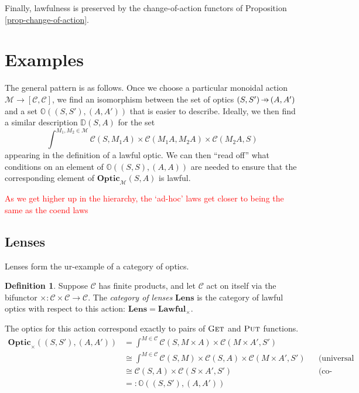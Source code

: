 \documentclass[11pt,a4paper]{article}
\theoremstyle{plain}
\theoremstyle{definition}
\newtheorem{definition}[theorem]{Definition}
\newcommand{\C}{\mathscr{C}}
\newcommand{\M}{\mathscr{M}}
\newcommand{\Optic}{\mathbf{Optic}}
\newcommand{\Lawful}{\mathbf{Lawful}}
\newcommand{\Lens}{\mathbf{Lens}}
\newcommand{\fget}{\textsc{Get}}
\newcommand{\fput}{\textsc{Put}}
\newcommand{\hto}{\ensuremath{\,\mathaccent\shortmid\rightarrow\,}}
\newcommand{\todo}[1]{\textcolor{red}{\small #1}}
\begin{document}
Finally, lawfulness is preserved by the change-of-action functors of Proposition \ref{prop-change-of-action}.

\section{Examples}
\label{lawful-examples}

The general pattern is as follows. Once we choose a particular monoidal action $\M \to [\C, \C]$, we find an isomorphism between the set of optics $(S, S') \hto (A, A')$ and a set $\mathbb{O}((S, S'), (A, A'))$ that is easier to describe. Ideally, we then find a similar description $\mathbb{D}(S, A)$ for the set \[ \int^{M_1, M_2 \in \M} \C(S, M_1 A) \times \C(M_1 A, M_2 A) \times \C(M_2 A, S)\] appearing in the definition of a lawful optic. We can then ``read off'' what conditions on an element of $\mathbb{O}((S, S), (A, A))$ are needed to ensure that the corresponding element of $\Optic_\M(S, A)$ is lawful.

\todo{As we get higher up in the hierarchy, the `ad-hoc' laws get closer to being the same as the coend laws}

\subsection{Lenses}

Lenses form the ur-example of a category of optics.

\begin{definition}
  Suppose $\C$ has finite products, and let $\C$ act on itself via the bifunctor $\times : \C \times \C \to \C$. The \emph{category of lenses} $\Lens$ is the category of lawful optics with respect to this action: $\Lens = \Lawful_\times$.
\end{definition}

The optics for this action correspond exactly to pairs of $\fget$ and $\fput$ functions.
\begin{align*}
  \Optic_\times((S, S'), (A, A')) &= \int^{M \in \C} \C(S, M \times A) \times \C(M \times A', S') \\
                                  &\cong \int^{M \in \C} \C(S, M) \times \C(S, A) \times \C(M \times A', S') && \text{(universal property of product)} \\
                                  &\cong \C(S, A) \times \C(S \times A', S') && \text{(co-Yoneda)} \\
                                  &=: \mathbb{O}((S, S'), (A, A'))
\end{align*}
\end{document}
